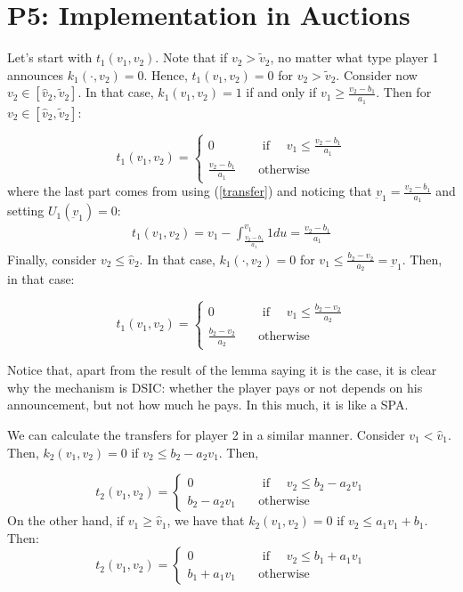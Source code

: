 \documentclass{article}
\newcommand{\enterProblemHeader}[1]{
\nobreak\extramarks{#1}{#1 continued on next page\ldots}\nobreak
\nobreak\extramarks{#1 (continued)}{#1 continued on next page\ldots}\nobreak
}
\newcommand{\exitProblemHeader}[1]{
\nobreak\extramarks{#1 (continued)}{#1 continued on next page\ldots}\nobreak
\nobreak\extramarks{#1}{}\nobreak
}
\newcounter{homeworkProblemCounter} %
\newcommand{\homeworkProblemName}{}
\newenvironment{ex}[1][Problem \arabic{homeworkProblemCounter}]{ %
\stepcounter{homeworkProblemCounter} %
\renewcommand{\homeworkProblemName}{#1} %
\section{\homeworkProblemName} %
}{
}
\begin{document}
\begin{ex}[P5: Implementation in Auctions]
	Let's start with $t_1(v_1,v_2)$. Note that if $v_2>\tilde{v}_2$, no matter what type player 1 announces $k_1(\cdot,v_2)=0$. Hence, $t_1(v_1,v_2)=0$ for $v_2>\tilde{v}_2$. Consider now $v_2\in[\hat{v}_2,\tilde{v}_2]$. In that case, $k_1(v_1,v_2)=1$ if and only if $v_1\geq\frac{v_2-b_1}{a_1}$. Then for $v_2\in[\hat{v}_2,\tilde{v}_2]$:
	
	\[t_1(v_1,v_2)=\left\{\begin{array}{cc} 0 & \quad\text{ if }\quad  v_1\leq\frac{v_2-b_1}{a_1}\\
	\frac{v_2-b_1}{a_1} & \quad\text{otherwise}\quad
	
	\end{array}
	\right.
	\]
	where the last part comes from using (\ref{transfer}) and noticing that $\underbar{v}_1=\frac{v_2-b_1}{a_1}$ and setting $U_1(\underbar{v}_1)=0$:
	\begin{align*}
	t_1(v_1,v_2)=v_1-\int_{\frac{v_2-b_1}{a_1}}^{v_1}1 du=\frac{v_2-b_1}{a_1}
	\end{align*}
	Finally, consider $v_2\leq\hat{v}_2$. In that case, $k_1(\cdot,v_2)=0$ for $v_1\leq \frac{b_2-v_2}{a_2}=\underbar{v}_1$. Then, in that case:
	
	\[t_1(v_1,v_2)=\left\{\begin{array}{cc} 0 & \quad\text{ if }\quad  v_1\leq\frac{b_2-v_2}{a_2}\\
	\frac{b_2-v_2}{a_2} & \quad\text{otherwise}\quad
	
	\end{array}
	\right.
	\]
	
	Notice that, apart from the result of the lemma saying it is the case, it is clear why the mechanism is DSIC: whether the player pays or not depends on his announcement, but not how much he pays. In this much, it is like a SPA.
	
	We can calculate the transfers for player 2 in a similar manner. Consider $v_1<\hat{v}_1$. Then, $k_2(v_1,v_2)=0$ if $v_2\leq b_2-a_2 v_1$. Then,
	
	\[t_2(v_1,v_2)=\left\{\begin{array}{cc} 0 & \quad\text{ if }\quad  v_2\leq b_2-a_2 v_1\\
	b_2-a_2 v_1 & \quad\text{otherwise}\quad
	
	\end{array}
	\right.
	\]
	On the other hand, if $v_1\geq\hat{v}_1$, we have that $k_2(v_1,v_2)=0$ if $v_2\leq a_1v_1+b_1$. Then:
	\[t_2(v_1,v_2)=\left\{\begin{array}{cc} 0 & \quad\text{ if }\quad  v_2\leq b_1+a_1 v_1\\
	b_1+a_1 v_1 & \quad\text{otherwise}\quad
	

\end{array}\]
\end{ex}
\end{document}
